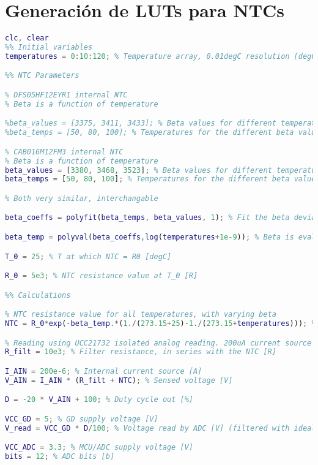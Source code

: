 \section{Generación de LUTs para NTCs}
\begin{lstlisting}[language=Matlab, basicstyle=\ttfamily\small, breaklines=true, frame=single]
%% Temperature sensing LUT calculation for DFS05HF12EYR1
clc, clear
%% Initial variables
temperatures = 0:10:120; % Temperature array, 0.01degC resolution [degC]

%% NTC Parameters

% DFS05HF12EYR1 internal NTC
% Beta is a function of temperature

%beta_values = [3375, 3411, 3433]; % Beta values for different temperatures [K]
%beta_temps = [50, 80, 100]; % Temperatures for the different beta values [degC]

% CAB016M12FM3 internal NTC
% Beta is a function of temperature
beta_values = [3380, 3468, 3523]; % Beta values for different temperatures [K]
beta_temps = [50, 80, 100]; % Temperatures for the different beta values [degC]

% Both very similar, interchangable

beta_coeffs = polyfit(beta_temps, beta_values, 1); % Fit the beta deviation with linear regression

beta_temp = polyval(beta_coeffs,log(temperatures+1e-9)); % Beta is evaluated for all temperatures, avoiding 0degC [K]

T_0 = 25; % T at which NTC = R0 [degC]

R_0 = 5e3; % NTC resistance value at T_0 [R]

%% Calculations

% NTC resistance value for all temperatures, with varying beta
NTC = R_0*exp(-beta_temp.*(1./(273.15+25)-1./(273.15+temperatures))); % NTC resistance with no errors [R]

% Reading using UCC21732 isolated analog reading. 200uA current source 
R_filt = 10e3; % Filter resistance, in series with the NTC [R]

I_AIN = 200e-6; % Internal current source [A]
V_AIN = I_AIN * (R_filt + NTC); % Sensed voltage [V]

D = -20 * V_AIN + 100; % Duty cycle out [%]

VCC_GD = 5; % GD supply voltage [V]
V_read = VCC_GD * D/100; % Voltage read by ADC [V] (filtered with ideal RC)

VCC_ADC = 3.3; % MCU/ADC supply voltage [V]
bits = 12; % ADC bits [b]


\end{lstlisting}
